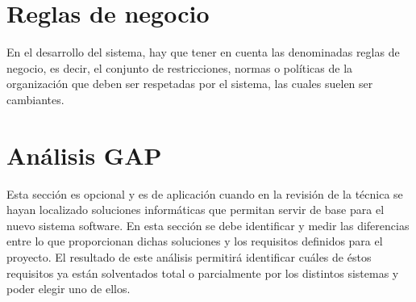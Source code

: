 \section{Reglas de negocio}
En el desarrollo del sistema, hay que tener en cuenta las denominadas reglas de negocio, es decir, el conjunto de restricciones, normas o políticas de la organización que deben ser respetadas por el sistema, las cuales suelen ser cambiantes.

\section{Análisis GAP}
Esta sección es opcional y es de aplicación cuando en la revisión de la técnica se hayan localizado soluciones informáticas que permitan servir de base para el nuevo sistema software. En esta sección se debe identificar y medir las diferencias entre lo que proporcionan dichas soluciones y los requisitos definidos para el proyecto. El resultado de este análisis permitirá identificar cuáles de éstos requisitos ya están solventados total o parcialmente por los distintos sistemas y poder elegir uno de ellos. 